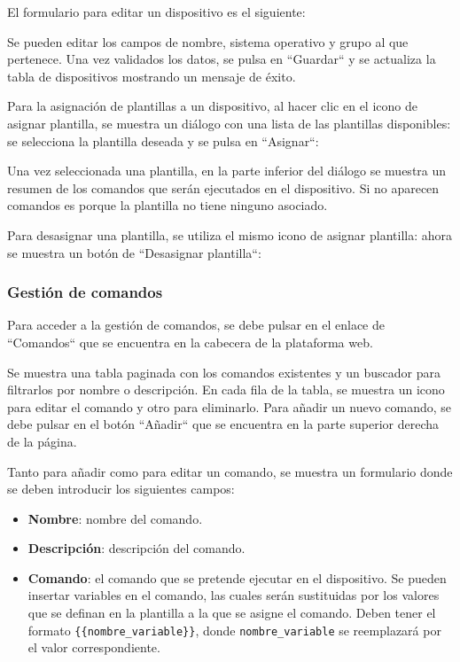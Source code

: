El formulario para editar un dispositivo es el siguiente:


Se pueden editar los campos de nombre, sistema operativo y grupo al que pertenece.
Una vez validados los datos, se pulsa en ``Guardar`` y se actualiza la tabla de dispositivos mostrando un mensaje de
éxito.

Para la asignación de plantillas a un dispositivo, al hacer clic en el icono de asignar plantilla, se muestra un
diálogo con una lista de las plantillas disponibles: se selecciona la plantilla deseada y se pulsa en ``Asignar``:


Una vez seleccionada una plantilla, en la parte inferior del diálogo se muestra un resumen de los comandos que serán
ejecutados en el dispositivo.
Si no aparecen comandos es porque la plantilla no tiene ninguno asociado.

Para desasignar una plantilla, se utiliza el mismo icono de asignar plantilla: ahora se muestra un botón de
``Desasignar plantilla``:


\subsubsection{Gestión de comandos}

Para acceder a la gestión de comandos, se debe pulsar en el enlace de ``Comandos`` que se encuentra en la cabecera
de la plataforma web.

Se muestra una tabla paginada con los comandos existentes y un buscador para filtrarlos por nombre o descripción.
En cada fila de la tabla, se muestra un icono para editar el comando y otro para eliminarlo.
Para añadir un nuevo comando, se debe pulsar en el botón ``Añadir`` que se encuentra en la parte superior derecha de la
página.


Tanto para añadir como para editar un comando, se muestra un formulario donde se deben introducir los siguientes campos:
\begin{itemize}
    \item \textbf{Nombre}: nombre del comando.
    \item \textbf{Descripción}: descripción del comando.
    \item \textbf{Comando}: el comando que se pretende ejecutar en el dispositivo.
    Se pueden insertar variables en el comando, las cuales serán sustituidas por los valores que se definan en la
    plantilla a la que se asigne el comando.
    Deben tener el formato \texttt{\{\{nombre\_variable\}\}}, donde \texttt{nombre\_variable} se reemplazará por el
    valor correspondiente.
\end{itemize}


